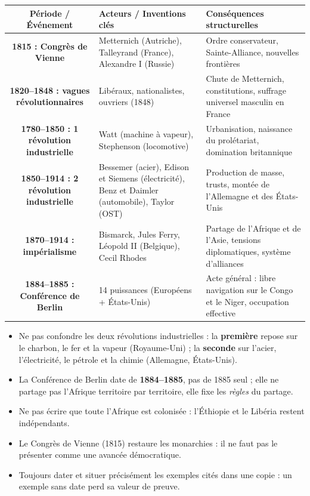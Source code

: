 \documentclass[11pt]{article}
\newcommand{\cle}[1]{{\popxbold\color{popdark}#1}}
\begin{document}
\begin{aretenir}
\begin{center}
\begin{tabularx}{\linewidth}{|>{\bfseries}c|X|X|}\hline
\rowcolor{popblueL}\textbf{Période / Événement} & \textbf{Acteurs / Inventions clés} & \textbf{Conséquences structurelles}\\\hline
1815 : Congrès de Vienne & Metternich (Autriche), Talleyrand (France), Alexandre I\ier{} (Russie) & Ordre conservateur, Sainte-Alliance, nouvelles frontières\\\hline
1820--1848 : vagues révolutionnaires & Libéraux, nationalistes, ouvriers (1848) & Chute de Metternich, constitutions, suffrage universel masculin en France\\\hline
1780--1850 : 1\iere{} révolution industrielle & Watt (machine à vapeur), Stephenson (locomotive) & Urbanisation, naissance du prolétariat, domination britannique\\\hline
1850--1914 : 2\ieme{} révolution industrielle & Bessemer (acier), Edison et Siemens (électricité), Benz et Daimler (automobile), Taylor (OST) & Production de masse, trusts, montée de l'Allemagne et des États-Unis\\\hline
1870--1914 : impérialisme & Bismarck, Jules Ferry, Léopold II (Belgique), Cecil Rhodes & Partage de l'Afrique et de l'Asie, tensions diplomatiques, système d'alliances\\\hline
1884--1885 : Conférence de Berlin & 14 puissances (Européens + États-Unis) & Acte général : libre navigation sur le Congo et le Niger, occupation effective\\\hline
\end{tabularx}
\end{center}
\end{aretenir}

\begin{attention}
\begin{itemize}
    \item Ne pas confondre les deux révolutions industrielles : la \textbf{première} repose sur le \cle{charbon}, le \cle{fer} et la \cle{vapeur} (Royaume-Uni) ; la \textbf{seconde} sur l'\cle{acier}, l'\cle{électricité}, le \cle{pétrole} et la \cle{chimie} (Allemagne, États-Unis).
    \item La Conférence de Berlin date de \textbf{1884--1885}, pas de 1885 seul ; elle ne partage pas l'Afrique territoire par territoire, elle fixe les \emph{règles} du partage.
    \item Ne pas écrire que toute l'Afrique est colonisée : l'\cle{Éthiopie} et le \cle{Libéria} restent indépendants.
    \item Le Congrès de Vienne (1815) restaure les monarchies : il ne faut pas le présenter comme une avancée démocratique.
    \item Toujours dater et situer précisément les exemples cités dans une copie : un exemple sans date perd sa valeur de preuve.
\end{itemize}
\end{attention}
\end{document}
